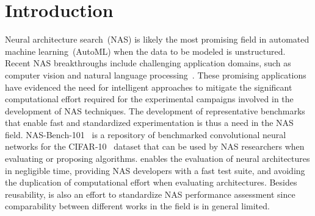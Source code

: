 \section{Introduction}


Neural architecture search~(NAS) is likely the most promising field in automated machine learning~(AutoML) when the data to be modeled is unstructured. Recent NAS breakthroughs include challenging application domains, such as computer vision and natural language processing~\cite{ReaAggHuaLe2019re,ZopLe2017nas,ZopVasShlLeh2018scalable}. These promising applications have evidenced the need for intelligent approaches to mitigate the significant computational effort required for the experimental campaigns involved in the development of NAS techniques.
The development of representative benchmarks that enable fast and standardized experimentation is thus a need in the NAS field.
NAS-Bench-101~\cite{YinKleChrReaMurHut2019nasbench} is a repository of benchmarked convolutional neural networks for the CIFAR-10~\cite{Krizhevsky2009cifar} dataset that can be used by NAS researchers when evaluating or proposing algorithms. \nasbench enables the evaluation of neural architectures in negligible time, providing NAS developers with a fast test suite, and avoiding the duplication of computational effort when evaluating architectures. Besides reusability, \nasbench is also an effort to standardize NAS performance assessment since comparability between different works in the field is in general limited. 



